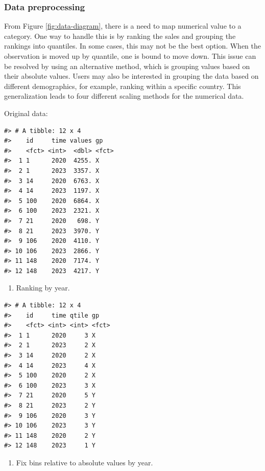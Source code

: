 \hypertarget{data-preprocessing}{%
\subsubsection{Data preprocessing}\label{data-preprocessing}}

From Figure \ref{fig:data-diagram}, there is a need to map numerical value to a category. One way to handle this is by ranking the sales and grouping the rankings into quantiles. In some cases, this may not be the best option. When the observation is moved up by quantile, one is bound to move down. This issue can be resolved by using an alternative method, which is grouping values based on their absolute values. Users may also be interested in grouping the data based on different demographics, for example, ranking within a specific country. This generalization leads to four different scaling methods for the numerical data.

Original data:

\begin{verbatim}
#> # A tibble: 12 x 4
#>    id     time values gp   
#>    <fct> <int>  <dbl> <fct>
#>  1 1      2020  4255. X    
#>  2 1      2023  3357. X    
#>  3 14     2020  6763. X    
#>  4 14     2023  1197. X    
#>  5 100    2020  6864. X    
#>  6 100    2023  2321. X    
#>  7 21     2020   698. Y    
#>  8 21     2023  3970. Y    
#>  9 106    2020  4110. Y    
#> 10 106    2023  2866. Y    
#> 11 148    2020  7174. Y    
#> 12 148    2023  4217. Y
\end{verbatim}

\begin{enumerate}
\def\labelenumi{\arabic{enumi}.}
\tightlist
\item
  Ranking by year.
\end{enumerate}

\begin{verbatim}
#> # A tibble: 12 x 4
#>    id     time qtile gp   
#>    <fct> <int> <int> <fct>
#>  1 1      2020     3 X    
#>  2 1      2023     2 X    
#>  3 14     2020     2 X    
#>  4 14     2023     4 X    
#>  5 100    2020     2 X    
#>  6 100    2023     3 X    
#>  7 21     2020     5 Y    
#>  8 21     2023     2 Y    
#>  9 106    2020     3 Y    
#> 10 106    2023     3 Y    
#> 11 148    2020     2 Y    
#> 12 148    2023     1 Y
\end{verbatim}

\begin{enumerate}
\def\labelenumi{\arabic{enumi}.}
\setcounter{enumi}{1}
\tightlist
\item
  Fix bins relative to absolute values by year.
\end{enumerate}

